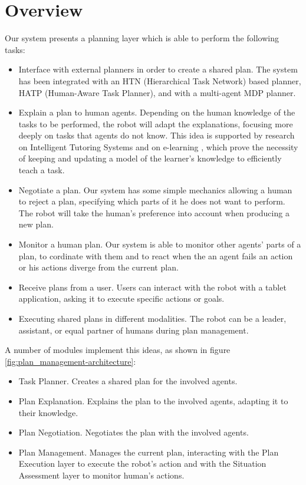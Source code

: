 \section{Overview}
\label{sec-plan_management-overview}
Our system presents a planning layer which is able to perform the following tasks:
\begin{itemize}
	\item Interface with external planners in order to create a shared plan. The system has been integrated with an HTN (Hierarchical Task Network) based planner, HATP (Human-Aware Task Planner), and with a multi-agent MDP planner.
	\item Explain a plan to human agents. Depending on the human knowledge of the tasks to be performed, the robot will adapt the explanations, focusing more deeply on tasks that agents do not know. This idea is supported by research on Intelligent Tutoring Systems \cite{brusilovskiy1994construction}  and on e-learning \cite{brusilovskiy2005}, which  prove the necessity of keeping and updating a model of the learner's knowledge to efficiently teach a task.
	\item Negotiate a plan. Our system has some simple mechanics allowing a human to reject a plan, specifying which parts of it he does not want to perform. The robot will take the human's preference into account when producing a new plan.
	\item Monitor a human plan. Our system is able to monitor other agents' parts of a plan, to cordinate with them and to react when the an agent fails an action or his actions diverge from the current plan.
	\item Receive plans from a user. Users can interact with the robot with a tablet application, asking it to execute specific actions or goals.
	\item Executing shared plans in different modalities. The robot can be a leader, assistant, or equal partner of humans during plan management.
\end{itemize}

A number of modules implement this ideas, as shown in figure \ref{fig:plan_management-architecture}:
\begin{itemize}
\item Task Planner. Creates a shared plan for the involved agents.
\item Plan Explanation. Explains the plan to the involved agents, adapting it to their knowledge.
\item Plan Negotiation. Negotiates the plan with the involved agents.
\item Plan Management. Manages the current plan, interacting with the Plan Execution layer to execute the robot's action and with the Situation Assessment layer to monitor human's actions.
\end{itemize}

